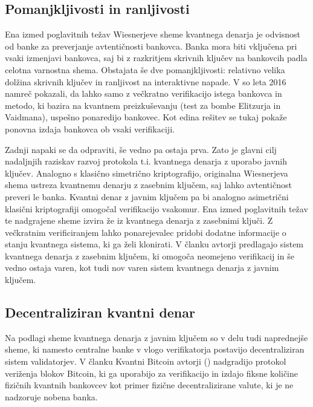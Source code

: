 \documentclass[12pt]{article}
\begin{document}
\subsection{Pomanjkljivosti in ranljivosti}

Ena izmed poglavitnih težav Wiesnerjeve sheme kvantnega denarja je odvisnost od banke za preverjanje avtentičnosti bankovca. Banka mora biti vključena pri vsaki izmenjavi bankovca, saj bi z razkritjem skrivnih ključev na bankovcih padla celotna varnostna shema. Obstajata še dve pomanjkljivosti: relativno velika dolžina skrivnih ključev in ranljivost na interaktivne napade. V \cite{brodutchAdaptiveAttackWiesner2016} so leta 2016 namreč pokazali, da lahko samo z večkratno verifikacijo istega bankovca in metodo, ki bazira na kvantnem preizkuševanju (test za bombe Elitzurja in Vaidmana), uspešno ponaredijo bankovec. Kot edina rešitev se tukaj pokaže ponovna izdaja bankovca ob vsaki verifikaciji.
\par Zadnji napaki se da odpraviti, še vedno pa ostaja prva. Zato je glavni cilj nadaljnjih raziskav razvoj protokola t.i. kvantnega denarja z uporabo javnih ključev. Analogno s klasično simetrično kriptografijo, originalna Wiesnerjeva shema ustreza kvantnemu denarju z zasebnim ključem, saj lahko avtentičnost preveri le banka. Kvantni denar z javnim ključem pa bi analogno asimetrični klasični kriptografiji omogočal verifikacijo vsakomur. Ena izmed poglavitnih težav te nadgrajene sheme izvira že iz kvantnega denarja z zasebnimi ključi. Z večkratnim verificiranjem lahko ponarejevalec pridobi dodatne informacije o stanju kvantnega sistema, ki ga želi klonirati. V članku \cite{aaronsonQuantumMoneyHidden2012} avtorji predlagajo sistem kvantnega denarja z zasebnim ključem, ki omogoča neomejeno verifikacij in še vedno ostaja varen, kot tudi nov varen sistem kvantnega denarja z javnim ključem. 

\subsection{Decentraliziran kvantni denar}

Na podlagi sheme kvantnega denarja z javnim ključem \cite{aaronsonQuantumMoneyHidden2012} so v delu tudi naprednejše sheme, ki namesto centralne banke v vlogo verifikatorja postavijo decentraliziran sistem validatorjev. V članku Kvantni Bitcoin avtorji (\cite{jogenforsQuantumBitcoinAnonymous2019}) nadgradijo protokol veriženja blokov Bitcoin, ki ga uporabijo za verifikacijo in izdajo fiksne količine fizičnih kvantnih bankovcev kot primer fizične decentralizirane valute, ki je ne nadzoruje nobena banka. 
\end{document}
